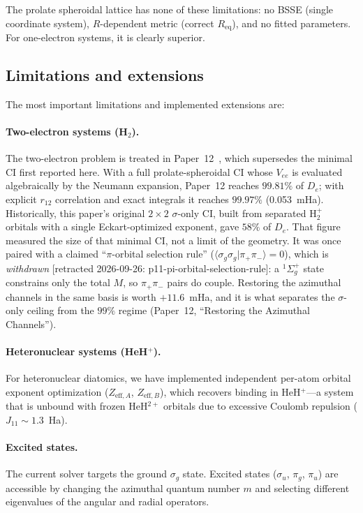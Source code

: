 \documentclass[aps,pra,twocolumn,superscriptaddress,longbibliography]{revtex4-2}
\begin{document}
The prolate spheroidal lattice has none of these limitations: no
BSSE (single coordinate system), $R$-dependent metric (correct
$R_{\mathrm{eq}}$), and no fitted parameters.  For one-electron
systems, it is clearly superior.

\subsection{Limitations and extensions}

The most important limitations and implemented extensions are:

\paragraph{Two-electron systems (H$_2$).}
The two-electron problem is treated in Paper~12~\cite{loutey_paper12},
which supersedes the minimal CI first reported here. With a full
prolate-spheroidal CI whose $V_{ee}$ is evaluated algebraically by the
Neumann expansion, Paper~12 reaches $99.81\%$ of $D_e$; with explicit
$r_{12}$ correlation and exact integrals it reaches $99.97\%$ (0.053~mHa).
Historically, this paper's original $2\times2$ $\sigma$-only CI,
built from separated H$_2^+$ orbitals with a single Eckart-optimized
exponent, gave $58\%$ of $D_e$. That figure measured the size of that
minimal CI, not a limit of the geometry. It was once paired with a claimed
``$\pi$-orbital selection rule'' ($\langle\sigma_g\sigma_g|\pi_+\pi_-\rangle=0$),
which is \emph{withdrawn} [retracted 2026-09-26: p11-pi-orbital-selection-rule]:
a $^1\Sigma_g^+$ state constrains only the total $M$, so $\pi_+\pi_-$ pairs do
couple. Restoring the azimuthal channels in the same basis is worth
$+11.6$~mHa, and it is what separates the $\sigma$-only ceiling from the
$99\%$ regime (Paper~12, ``Restoring the Azimuthal Channels'').

\paragraph{Heteronuclear systems (HeH$^+$).}
For heteronuclear diatomics, we have implemented independent
per-atom orbital exponent optimization ($Z_{\mathrm{eff},A}$,
$Z_{\mathrm{eff},B}$), which recovers binding in HeH$^+$---a
system that is unbound with frozen HeH$^{2+}$ orbitals due to
excessive Coulomb repulsion ($J_{11} \sim 1.3$~Ha).

\paragraph{Excited states.}
The current solver targets the ground $\sigma_g$ state.  Excited
states ($\sigma_u$, $\pi_g$, $\pi_u$) are accessible by changing
the azimuthal quantum number $m$ and selecting different eigenvalues
of the angular and radial operators.
\end{document}
